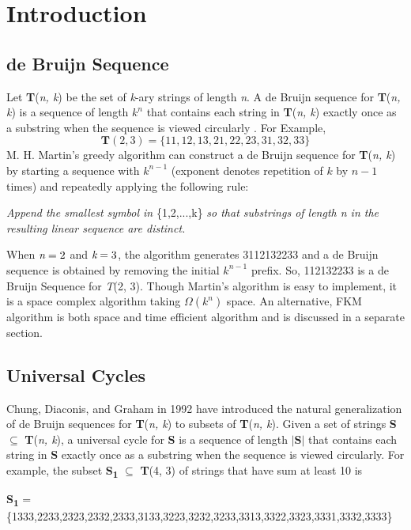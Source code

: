 \documentclass[12pt,twoside]{article}
\begin{document}
\section{Introduction}
\subsection{de Bruijn Sequence}
Let \textbf{T}(\emph{n, k}) be the set of \emph{k}-ary strings of length \emph{n}. A de Bruijn sequence for \textbf{T}(\emph{n, k}) is a sequence of length $k^n$ that contains each string in \textbf{T}(\emph{n, k}) exactly once as a substring when the sequence is viewed circularly \cite{Sawada}. For Example, \[\textbf{T}(2, 3) = \{11, 12, 13, 21, 22, 23, 31, 32, 33\}\]
M. H. Martin's greedy algorithm \cite{Martin} can construct a de Bruijn sequence for \textbf{T}(\emph{n, k}) by starting a sequence with $k^{n-1}$ (exponent denotes repetition of $k$ by $n-1$ times) and repeatedly applying the following rule:
\begin{center} \emph{Append the smallest symbol in} \{1,2,...,k\} \emph{so that substrings of length n in the resulting linear sequence are distinct.} \end{center}
When $\emph{n}=2$ and $\emph{k}=3$, the algorithm generates 3112132233 and a de Bruijn sequence is obtained by removing the initial $k^{n-1}$ prefix. So, 112132233 is a de Bruijn Sequence for \emph{T}(2, 3). Though Martin's algorithm is easy to implement, it is a space complex algorithm taking $\Omega(k^n)$ space. An alternative, FKM algorithm is both space and time efficient algorithm and is discussed in a separate section. 

\subsection{Universal Cycles}
Chung, Diaconis, and Graham in 1992 \cite{Chung} have introduced the natural generalization of de Bruijn sequences for \textbf{T}(\emph{n, k}) to subsets of \textbf{T}(\emph{n, k}). Given a set of strings \textbf{S} $\subseteq$ \textbf{T}(\emph{n, k}), a universal cycle for \textbf{S} is a sequence of length $\mid$\textbf{S}$\mid$ that contains each string in \textbf{S} exactly once as a substring when the sequence is viewed circularly. For example, the subset \textbf{S\textsubscript{1}}  $\subseteq$  \textbf{T}(4, 3) of strings that have sum at least 10 is \begin{center} \textbf{S\textsubscript{1}} = \{1333,2233,2323,2332,2333,3133,3223,3232,3233,3313,3322,3323,3331,3332,3333\} \end{center}
\end{document}
